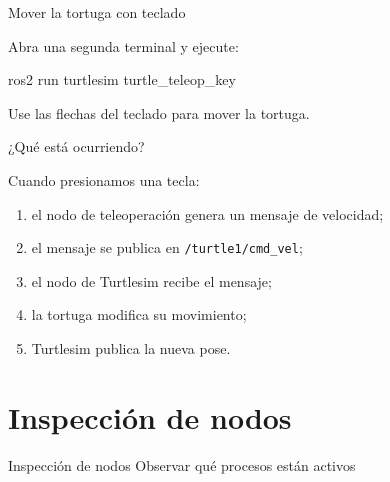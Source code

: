 \documentclass[aspectratio=169]{beamer}
\begin{document}
\begin{frame}[fragile]{Mover la tortuga con teclado}

Abra una segunda terminal y ejecute:

\begin{bashcodedark}
    ros2 run turtlesim turtle_teleop_key
\end{bashcodedark}

Use las flechas del teclado para mover la tortuga.

\vspace{0.3cm}


\end{frame}

\begin{frame}{¿Qué está ocurriendo?}

Cuando presionamos una tecla:

\begin{enumerate}
    \item el nodo de teleoperación genera un mensaje de velocidad;
    \item el mensaje se publica en \texttt{/turtle1/cmd\_vel};
    \item el nodo de Turtlesim recibe el mensaje;
    \item la tortuga modifica su movimiento;
    \item Turtlesim publica la nueva pose.
\end{enumerate}

\vspace{0.3cm}


\end{frame}

\section{Inspección de nodos}

\SectionSlide
{Inspección de nodos}
{Observar qué procesos están activos}
\end{document}
